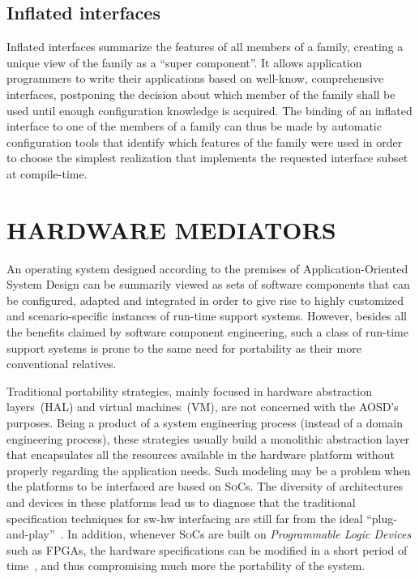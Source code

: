\documentclass{kapproc} %
\begin{document}
\subsection*{Inflated interfaces}

 Inflated interfaces summarize the features of all members of a
 family, creating a unique view of the family as a ``super
 component''. It allows application programmers to write their
 applications based on well-know, comprehensive interfaces, postponing
 the decision about which member of the family shall be used until
 enough configuration knowledge is acquired. The binding of an
 inflated interface to one of the members of a family can thus be made
 by automatic configuration tools that identify which features of the
 family were used in order to choose the simplest realization that
 implements the requested interface subset at compile-time.

\section[HARDWARE MEDIATORS]
{HARDWARE MEDIATORS}\label{mediators}

 An operating system designed according to the premises of
 Application-Oriented System Design can be summarily viewed as sets of
 software components that can be configured, adapted and integrated in
 order to give rise to highly customized and scenario-specific
 instances of run-time support systems. However, besides all the
 benefits claimed by software component engineering, such a class of
 run-time support systems is prone to the same need for portability as
 their more conventional relatives.

 Traditional portability strategies, mainly focused in hardware
 abstraction layers~(HAL) and virtual machines~(VM), are not concerned
 with the AOSD's purposes. Being a product of a system engineering
 process (instead of a domain engineering process), these strategies
 usually build a monolithic abstraction layer that encapsulates all
 the resources available in the hardware platform without properly
 regarding the application needs. Such modeling may be a problem when
 the platforms to be interfaced are based on \textsc{SoC}s. The
 diversity of architectures and devices in these platforms lead us to
 diagnose that the traditional specification techniques for sw-hw
 interfacing are still far from the ideal
 ``plug-and-play''~\cite{Neville:2003}. In addition, whenever
 \textsc{SoC}s are built on \emph{Programmable Logic Devices} such as
 FPGAs, the hardware specifications can be modified in a short period
 of time~\cite{Rutenbar:2001}, and thus compromising much more the
 portability of the system.
\end{document}
